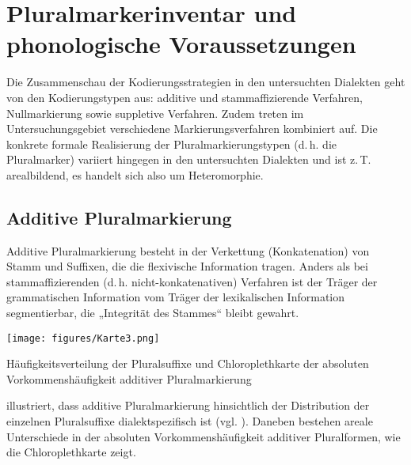 \section{Pluralmarkerinventar und phonologische Voraussetzungen}
\label{sec:7.1}
Die Zusammenschau der Kodierungsstrategien in den untersuchten Dialekten geht von den Kodierungstypen aus: additive und stammaffizierende Verfahren, Nullmarkierung sowie suppletive Verfahren. Zudem treten im Untersuchungsgebiet verschiedene Markierungsverfahren kombiniert auf. Die konkrete formale Realisierung der Pluralmarkierungstypen (d.\,h. die Pluralmarker) variiert hingegen in den untersuchten Dialekten und ist z.\,T. areal\-bildend, es handelt sich also um Heteromorphie.

\subsection{Additive Pluralmarkierung}\label{sec:7.1.1}
\begin{sloppypar}
Additive Pluralmarkierung besteht in der Verkettung (Konkatenation) von Stamm und Suffixen, die die flexivische Information tragen. Anders als bei stammaffizierenden (d.\,h. nicht-konkatenativen) Verfahren ist der Träger der grammatischen Information vom Träger der lexikalischen Information segmentierbar, die „Integrität des Stammes“ \citep[182]{Seiler2008} bleibt gewahrt.
\end{sloppypar}

\begin{map}
\texttt{[image: figures/Karte3.png]}
\caption{Häufigkeitsverteilung der Pluralsuffixe und Chloroplethkarte der absoluten Vorkommenshäufigkeit additiver Pluralmarkierung}
\label{map:3}
\end{map}

 illustriert, dass additive Pluralmarkierung hinsichtlich der Distribution der einzelnen Pluralsuffixe dialektspezifisch ist (vgl. ). Daneben bestehen areale Unterschiede in der absoluten Vorkommenshäufigkeit additiver Pluralformen, wie die Chloroplethkarte zeigt.

